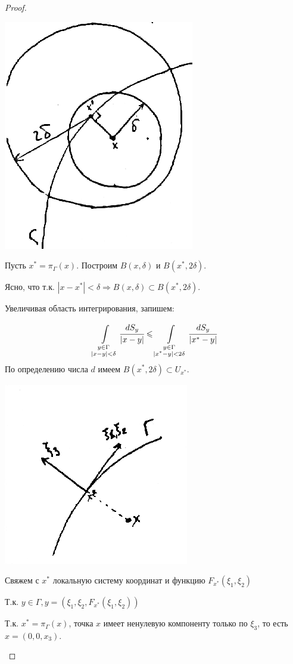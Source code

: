 \begin{proof}
\begin{enumerate}
\begin{center}
\includegraphics[scale = 0.25]{30_3_new}
\end{center}

Пусть $x^* = \pi_\Gamma(x)$. Построим $B(x,\delta)$ и $B(x^*, 2\delta)$.

Ясно, что т.к. $|x - x^*| < \delta \Rightarrow B(x, \delta) \subset B(x^*, 2\delta)$.

Увеличивая область интегрирования, запишем:


\[
\int\limits_{\substack{y \in \Gamma \\ |x-y|<\delta}}\cfrac{dS_y}{|x-y|} \leqslant \int\limits_{\substack{y \in \Gamma \\ |x^*-y|<2\delta}}\cfrac{dS_y}{|x^*-y|}
\]
По определению числа $d$ имеем $B(x^*, 2\delta) \subset U_{x^*}$. 
\begin{center}
\includegraphics[width=0.2\linewidth]{30_4_new} 
\end{center}

Свяжем с $x^*$ локальную систему координат и функцию $F_{x^*} (\xi_1, \xi_2)$


Т.к. $y \in \Gamma, y = (\xi_1, \xi_2, F_{x^*}(\xi_1, \xi_2))$

Т.к. $x^* = \pi_\Gamma(x)$, точка $x$ имеет ненулевую компоненту только по $\xi_3$, то есть $x = (0,0,x_3)$.



\end{enumerate}
\end{proof}
